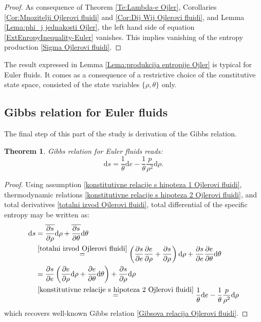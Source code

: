 \documentclass[a4paper,fleqn]{cas-sc}
\newtheorem{theorem}{Theorem}[section]
\theoremstyle{definition}
\begin{document}
\begin{proof}
	As consequence of Theorem \ref{Te:Lambda-e Ojler}, Corollaries \ref{Cor:Mnozitelji Ojlerovi fluidi} and \ref{Cor:Dij Wij Ojlerovi fluidi}, and Lemma \ref{Lema:phi_j jednakosti Ojler}, the left hand side of equation \eqref{ExtEnropyInequality-Euler} vanishes. This implies vanishing of the entropy production \eqref{Sigma Ojlerovi fluidi}. 
\end{proof} 

The result expressed in Lemma \ref{Lema:produkcija entropije Ojler} is typical for Euler fluids. It comes as a consequence of a restrictive choice of the constitutive state space, consisted of the state variables $\{ \rho, \theta \}$ only. 

\subsection{Gibbs relation for Euler fluids}

The final step of this part of the study is derivation of the Gibbs relation. 

\begin{theorem} 
	Gibbs relation for Euler fluids reads: 
	\begin{equation} \label{Gibsova relacija Ojlerovi fluidi}
		\mathrm{d}s = \dfrac{1}{\theta} \mathrm{d}e
		- \dfrac{1}{\theta}\dfrac{p}{\rho^2} \mathrm{d}\rho.
	\end{equation}
\end{theorem}
\begin{proof}
	Using assumption \eqref{konstitutivne relacije s hipoteza 1 Ojlerovi fluidi}, thermodynamic relations \eqref{konstitutivne relacije s hipoteza 2 Ojlerovi fluidi}, and total derivatives \eqref{totalni izvod Ojlerovi fluidi}, total differential of the specific entropy may be written as:
	\begin{align*}
		\mathrm{d}s & = \overline{\dfrac{\partial s}{\partial \rho}} \mathrm{d}\rho 
		+ \overline{\dfrac{\partial s}{\partial \theta}} \mathrm{d}\theta 
		\\ 
		& \overset{\eqref{totalni izvod Ojlerovi fluidi}}{=} 
		\left( \dfrac{\partial s}{\partial e} \dfrac{\partial e}{\partial \rho} 
		+ \dfrac{\partial s}{\partial \rho} \right) \mathrm{d}\rho 
		+ \dfrac{\partial s}{\partial e} \dfrac{\partial e}{\partial \theta} \mathrm{d}\theta
		\\ 
		& = \dfrac{\partial s}{\partial e} \left( \dfrac{\partial e}{\partial \rho} \mathrm{d}\rho 
		+ \dfrac{\partial e}{\partial \theta} \mathrm{d}\theta \right) 
		+ \dfrac{\partial s}{\partial \rho} \mathrm{d} \rho 
		\\
		& \overset{\eqref{konstitutivne relacije s hipoteza 2 Ojlerovi fluidi}}{=} 
		\dfrac{1}{\theta} \mathrm{d}e
		- \dfrac{1}{\theta}\dfrac{p}{\rho^2} \mathrm{d}\rho
	\end{align*}
	which recovers well-known Gibbs relation \eqref{Gibsova relacija Ojlerovi fluidi}. 
\end{proof}
\end{document}
